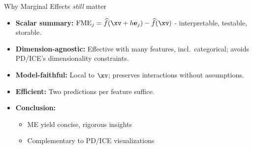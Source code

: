 \documentclass[11pt,compress,t,notes=noshow, aspectratio=169, xcolor=table]{beamer}
\begin{document}
\begin{frame}{Why Marginal Effects \emph{still} matter}

\begin{itemize}\setlength\itemsep{0.4em}
  \item \textbf{Scalar summary:}  
        $\text{FME}_j = \widehat f(\xv+h\mathbf e_j)-\widehat f(\xv)$ - interpretable, testable, storable.
        
  \item \textbf{Dimension-agnostic:}  
        Effective with many features, incl.\ categorical; avoids PD/ICE's dimensionality constraints.
        
  \item \textbf{Model-faithful:}  
        Local to $\xv$; preserves interactions without assumptions.

  \item \textbf{Efficient:}  
        Two predictions per feature suffice.
  \item \textbf{Conclusion:}
  \begin{itemize}
      \item ME yield concise, rigorous insights
      \item Complementary to PD/ICE visualizations
  \end{itemize}
\end{itemize}

\end{frame}
\end{document}
